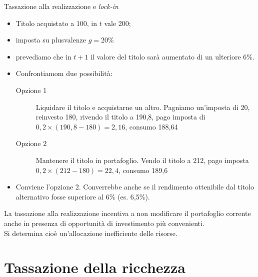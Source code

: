 \documentclass[aspectratio=149,11pt,italian]{beamer}
\begin{document}
\begin{frame}{Tassazione alla realizzazione e \emph{lock-in}}
\begin{itemize}
\item Titolo acquistato a 100, in $t$ vale 200;
\item imposta su plusvalenze $g=20\%$
\item prevediamo che in $t+1$ il valore del titolo sarà aumentato di un ulteriore 6\%.
\item Confrontiamom due possibilità:
  \begin{description}
  \item[{Opzione 1}] Liquidare il titolo e acquistarne un altro. Pagniamo
    un'imposta di 20, reinvesto 180, rivendo il titolo a 190,8, pago imposta
    di $0,2\times(190,8-180)=2,16$, consumo 188,64
  \item[{Opzione 2}] Mantenere il titolo in portafoglio. Vendo il titolo a
    212, pago imposta $0,2\times(212-180)=22,4$, consumo 189,6
  \end{description}
\item Conviene l'opzione 2. Converrebbe anche se il rendimento ottenibile dal
  titolo alternativo fosse superiore al 6\% (es. 6,5\%).
\end{itemize}
La tassazione alla realizzazione incentiva a non modificare il portafoglio
corrente
\alert{anche in presenza di opportunità di investimento più convenienti}.\\
Si determina cioè \alert{un'allocazione inefficiente delle risorse}.
\end{frame}

\section{Tassazione della ricchezza}
\end{document}
